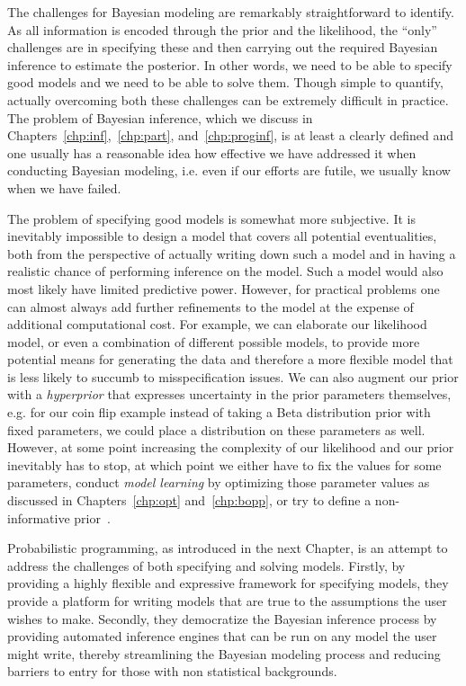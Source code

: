 The challenges for Bayesian modeling are remarkably straightforward to identify.  As all information
is encoded through the prior and the likelihood, the ``only'' challenges are in specifying these
and then carrying out the required Bayesian inference to estimate the posterior.  In other words, we need
to be able to specify good models and we need to be able to solve them.  Though simple to
quantify, actually overcoming both these challenges can be extremely difficult in practice.  The problem
of Bayesian inference, which we discuss in Chapters~\ref{chp:inf},~\ref{chp:part}, and~\ref{chp:proginf},
 is at least a clearly defined and one usually has a reasonable idea
how effective we have addressed it when conducting Bayesian modeling, i.e. even if our efforts are
futile, we usually know when we have failed.  

The problem of specifying good models is somewhat more subjective.  It is inevitably impossible
to design a model that covers all potential eventualities, both from the perspective of actually writing
down such a model and in having a realistic chance of performing inference on the model.  Such a model
would also most likely have limited predictive power.  However, for practical problems one can almost always
add further refinements to the model at the expense of additional computational cost. For example, we can
elaborate our likelihood model, or even a combination of different possible models, to provide more 
potential means  for generating the data and therefore a more flexible model that is less likely to 
succumb to misspecification issues.  We can also augment our prior with a \emph{hyperprior} that 
expresses uncertainty in the prior parameters themselves, e.g. for our coin flip example instead of
taking a Beta distribution prior with fixed parameters, we could place a distribution on these parameters
as well.  However, at some point increasing the complexity of our likelihood and our prior inevitably 
has to stop, at which point we either have to fix the values for some parameters, conduct
\emph{model learning} by optimizing those parameter values as discussed in Chapters~\ref{chp:opt}
and~\ref{chp:bopp}, or try to define a non-informative prior~\citep{robert2007bayesian}.


Probabilistic programming, as introduced in the next Chapter, is an
attempt to address the challenges of both specifying and solving models.  
Firstly, by providing a highly flexible and expressive framework for specifying models, 
they provide a platform for writing models that are true to the assumptions the user wishes
to make.  Secondly, they democratize the Bayesian inference process by providing automated
inference engines that can be run on any model the user might write, thereby streamlining the Bayesian
modeling process and reducing barriers to entry for those with non statistical backgrounds.
